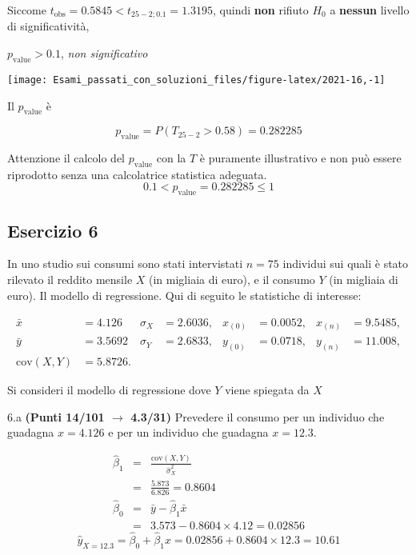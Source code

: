 \documentclass[
  11pt,
]{book}
\theoremstyle{mytheoremstyle}
\theoremstyle{mydefstyle}
\newenvironment{sol}
  {
  \begin{tcolorbox}[enhanced,breakable,arc=0.1mm,boxrule=1pt,colback=white,colframe=iblue,
  title=\bf \fontfamily{lmss}\selectfont \hspace{.5 cm} Soluzione,drop fuzzy shadow]

}{
\end{tcolorbox}
  }
\begin{document}
\begin{sol}
Siccome \(t_\text{obs}=0.5845<t_{25-2;0.1}=1.3195\), quindi \textbf{non} rifiuto \(H_0\) a \textbf{nessun} livello di significatività,

\(p_\text{value}>0.1\), \emph{non significativo}

\begin{center}\texttt{[image: Esami\_passati\_con\_soluzioni\_files/figure-latex/2021-16,-1]} \end{center}

Il \(p_{\text{value}}\) è

\[ p_{\text{value}} = P(T_{25-2}>0.58)=0.282285 \]

Attenzione il calcolo del \(p_\text{value}\) con la \(T\) è puramente illustrativo e non può essere riprodotto senza una calcolatrice statistica adeguata.\[
 0.1 < p_\text{value}= 0.282285 \leq 1 
\]

\end{sol}

\subsection{Esercizio 6}\label{esercizio-6-3}

In uno studio sui consumi sono stati intervistati \(n=75\) individui
sui quali è stato rilevato il reddito mensile \(X\) (in migliaia di euro), e il consumo \(Y\) (in migliaia di euro). Il modello di regressione. Qui di seguito le statistiche di interesse:

\begin{align*}
\bar x&=4.126 &\hat \sigma_X&=2.6036, &x_{(0)}&=0.0052,  &x_{(n)}&=9.5485,\\
\bar y&=3.5692 &\hat \sigma_Y&=2.6833, &y_{(0)}&=0.0718,  &y_{(n)}&=11.008,\\
\text{cov}(X,Y)&=5.8726.
\end{align*}

Si consideri il modello di regressione dove \(Y\) viene spiegata da \(X\)

6.a \textbf{(Punti 14/101 \(\rightarrow\) 4.3/31)} Prevedere il consumo per un individuo che guadagna \(x=4.126\) e
per un individuo che guadagna \(x=12.3\).

\begin{sol}
\begin{eqnarray*}
       \hat\beta_1 &=& \frac{\text{cov}(X,Y)}{\hat\sigma_X^2} \\
            &=& \frac{ 5.873 }{ 6.826 }  =  0.8604 \\
      \hat\beta_0 &=& \bar y - \hat\beta_1 \bar x\\
          &=&  3.573 - 0.8604 \times  4.12 = 0.02856 
      \end{eqnarray*}\[\hat y_{X= 12.3 }=\hat\beta_0+\hat\beta_1 x= 0.02856 + 0.8604 \times 12.3 = 10.61 \]

\end{sol}
\end{document}
